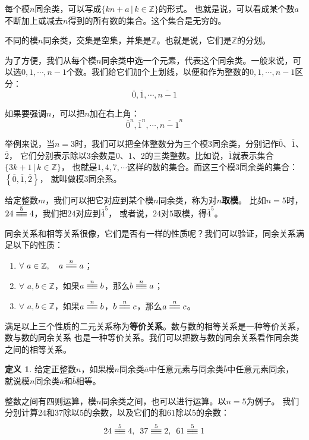 \documentclass[12pt,UTF8]{ctexbook}
\theoremstyle{definition}
\newtheorem{df}{定义}[section]
\theoremstyle{plain}
\newcommand{\tong}[1]{\overset{#1}{\equiv\joinrel\equiv}}
\begin{document}
每个模$n$同余类，可以写成$\{kn + a \, | \, k\in\mathbb{Z} \}$的形式。
也就是说，可以看成某个数$a$不断加上或减去$n$得到的所有数的集合。这个集合是无穷的。

不同的模$n$同余类，交集是空集，并集是$\mathbb{Z}$。也就是说，它们是$\mathbb{Z}$的分划。

为了方便，我们从每个模$n$同余类中选一个元素，代表这个同余类。一般来说，可以选$0,1,\cdots,n-1$个数。我们给它们加个上划线，以便和作为整数的$0,1,\cdots,n-1$区分：
$$\overline{0},\overline{1},\cdots,\overline{n-1}$$

如果要强调$n$，可以把$n$加在右上角：
$$\overline{0}^n,\overline{1}^n,\cdots,\overline{n-1}^n$$

举例来说，当$n=3$时，我们可以把全体整数分为三个模$3$同余类，分别记作$\overline{0}$、$\overline{1}$、$\overline{2}$，
它们分别表示除以$3$余数是$0$、$1$、$2$的三类整数。比如说，$\overline{1}$就表示集合$\{3k + 1 \, | \, k\in\mathbb{Z} \}$，
也就是$1, 4, 7,\cdots$这样的数的集合。而这三个模$3$同余类的集合：$\left\{\overline{0},\overline{1},\overline{2}\right\}$，
就叫做模$3$同余系。

给定整数$m$，我们可以把它对应到某个模$n$同余类，称为对$n$\textbf{取模}。
比如$n=5$时，$24 \tong{5} 4$，我们把$24$对应到$\overline{4}^5$，
或者说，$24$对$5$取模，得$\overline{4}^5$。

同余关系和相等关系很像，它们是否有一样的性质呢？我们可以验证，同余关系满足以下的性质：
\begin{enumerate}
    \item $\forall \,\, a\in \mathbb{Z}, \quad a \tong{n} a$；
    \item $\forall \,\, a, b \in \mathbb{Z}$，如果$a \tong{n} b$，那么$b \tong{n} a$；
    \item $\forall \,\, a, b \in \mathbb{Z}$，如果$a \tong{n} b$，$b \tong{n} c$，那么$a \tong{n} c$。
\end{enumerate}

满足以上三个性质的二元关系称为\textbf{等价关系}。数与数的相等关系是一种等价关系，数与数的同余关系
也是一种等价关系。我们可以把数与数的同余关系看作同余类之间的相等关系。

\begin{df}
    给定正整数$n$，如果模$n$同余类$\overline{a}$中任意元素与同余类$\overline{b}$中任意元素同余，
    就说模$n$同余类$\overline{a}$和$\overline{b}$相等。
\end{df}

整数之间有四则运算，模$n$同余类之间，也可以进行运算。以$n=5$为例子。
我们分别计算$24$和$37$除以$5$的余数，以及它们的和$61$除以$5$的余数：
$$ 24 \tong{5} 4, \,\,\, 37 \tong{5} 2 , \,\,\, 61 \tong{5} 1$$
\end{document}
